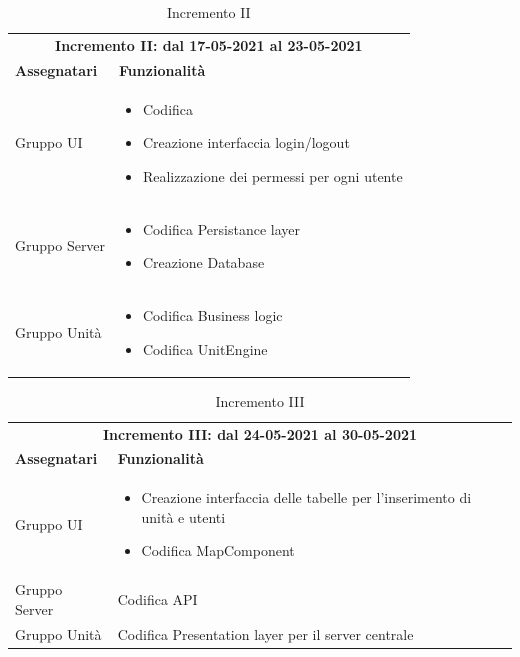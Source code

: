  \begin{table} [h!]
 	\begin{center}
 		\begin{tabular} { m{4cm}  m{11cm}  }	
 			\multicolumn{2}{c}{	\textbf{Incremento II: dal 17-05-2021 al 23-05-2021}} \\
 			\rowcolor{lightgray}
 			\textbf{Assegnatari} & \textbf{Funzionalità} \\
 			Gruppo UI & \begin{itemize}
 				\item Codifica \glock{WebSocket}
 				\item Creazione interfaccia login/logout
 				\item Realizzazione dei permessi per ogni utente
 			\end{itemize}\\		
 			Gruppo Server & \begin{itemize}
 				\item Codifica Persistance layer
 				\item Creazione Database
 			\end{itemize}\\		
 			Gruppo Unità & \begin{itemize}
 				\item Codifica Business logic
 				\item Codifica UnitEngine
 			\end{itemize}\\		
 		\end{tabular}
 		\caption{Incremento II}
 	\end{center}
 \end{table}

 \begin{table} [h!]
	\begin{center}
		\begin{tabular} { m{4cm}  m{11cm}  }	
			\multicolumn{2}{c}{	\textbf{Incremento III: dal 24-05-2021 al 30-05-2021}} \\
			\rowcolor{lightgray}
			\textbf{Assegnatari} & \textbf{Funzionalità} \\
			Gruppo UI & \begin{itemize}
				\item Creazione interfaccia delle tabelle per l'inserimento di unità e utenti
				\item Codifica MapComponent	
			\end{itemize}\\		
			Gruppo Server & Codifica API\\
			Gruppo Unità & Codifica Presentation layer per il server centrale
		
		\end{tabular}
		\caption{Incremento III}
	\end{center}
\end{table}


